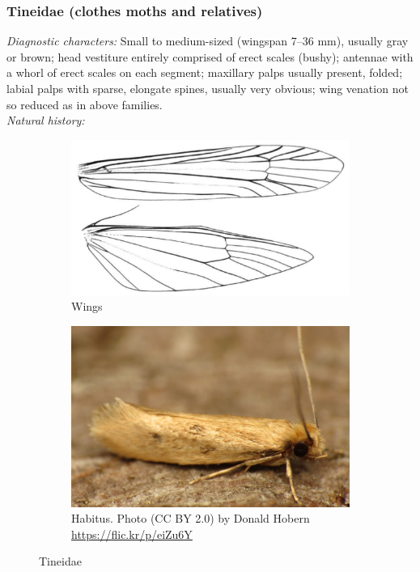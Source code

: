 \documentclass[letterpaper, 11pt]{article}
\begin{document}
\subsubsection{Tineidae (clothes moths and relatives)}
\noindent{}\textit{Diagnostic characters:} Small to medium-sized (wingspan 7--36 mm), usually gray or brown; head vestiture entirely comprised of erect scales (bushy); antennae with a whorl of erect scales on each segment; maxillary palps usually present, folded; labial palps with sparse, elongate spines, usually very obvious; wing venation not so reduced as in above families.\\

\noindent{}\textit{Natural history:} 

\begin{figure}[ht!]
    \centering
    \begin{subfigure}[ht!]{0.45\textwidth}
        \includegraphics[width=\textwidth]{TineidWings}
        \caption{Wings \citep[][Fig. 6]{DavisTineid1998}}
        \label{fig:tineid1}
    \end{subfigure}
    \qquad %
    \begin{subfigure}[ht!]{0.45\textwidth}
        \includegraphics[width=\textwidth]{tineid1}
        \caption{Habitus. Photo (CC BY 2.0) by Donald Hobern \url{https://flic.kr/p/eiZu6Y}}
        \label{fig:tineid2}
    \end{subfigure}
    \caption{Tineidae}\label{fig:tineids}
\end{figure}
\end{document}
